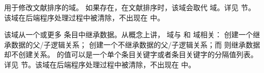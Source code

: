 \begin{fieldlist}

用于修改文献排序的域。
如果存在，在文献排序时，该域会取代  域。详见  节。
该域在后端程序处理过程中被清除，不出现在  中。



该域从一个或更多  条目中继承数据。从概念上讲， 域与  和  域相关： 创建一个继承数据的父/子逻辑关系；
 创建一个不继承数据的父/子逻辑关系；而  则继承数据却不创建关系。
 的值可以是一个单个条目关键字或者条目关键字的分隔值列表。
详见  节。该域在后端程序处理过程中被清除，不出现在  中。




\end{fieldlist}
